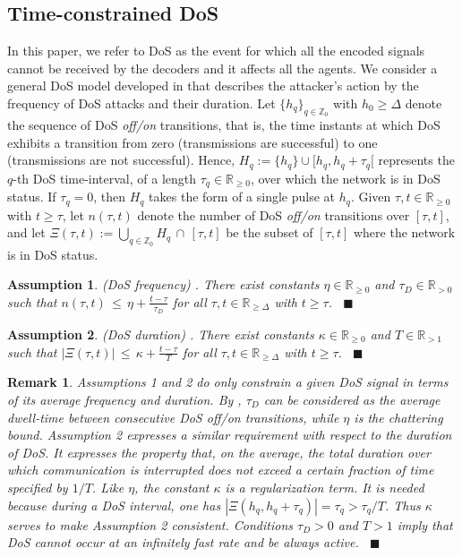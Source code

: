 \documentclass[letterpaper,journal,final,twocolumn]{IEEEtran}
\def\qedp{\hspace*{\fill}~{\tiny $\blacksquare$}}
\newtheorem{itremark}{Remark}
\newtheorem{itassumption}{Assumption}
\newenvironment{remark}{\begin{itremark}\rm}{\end{itremark}}
\newenvironment{assumption}{\begin{itassumption}\rm}{\end{itassumption}}
\begin{document}
\vspace{-2mm}

\subsection{Time-constrained DoS}
\vspace{-1mm}
In this paper, we refer to DoS as the event for which all the encoded signals cannot be received by the decoders and it affects all the agents.  
We consider a general DoS model developed in \cite{de2015input}
that describes the attacker's action by the frequency of DoS attacks and their duration. Let 
$\{h_q\}_{q \in \mathbb Z_0}$ with $h_0 \geq \Delta$ denote the sequence 
of DoS \emph{off/on} transitions, that is,
the time instants at which DoS exhibits 
a transition from zero (transmissions are successful) to one 
(transmissions are not successful).
Hence,
$
H_q :=\{h_q\} \cup [h_q,h_q+\tau_q[  
$
represents the $q$-th DoS time-interval, of a length $\tau_q \in \mathbb R_{\geq 0}$,
over which the network is in DoS status. If $\tau_q=0$, then
$H_q$ takes the form of a single pulse at $h_q$.  
Given $\tau,t \in \mathbb R_{\geq0}$ with $t\geq\tau$, 
let $n(\tau,t)$
denote the number of DoS \emph{off/on} transitions
over $[\tau,t]$, and let 
$
\Xi(\tau,t) := \bigcup_{q \in \mathbb Z_0} H_q  \, \cap  \, [\tau,t] 
$
be the subset of $[\tau,t]$ where the network is in DoS status. 

\begin{assumption}
(\emph{DoS frequency}) \cite{de2015input}. 
	There exist constants 
	$\eta \in \mathbb R_{\geq 0}$ and 
	$\tau_D \in \mathbb R_{> 0}$ such that
$
	n(\tau,t)  \, \leq \,  \eta + \frac{t-\tau}{\tau_D}
$
	for all  $\tau,t \in \mathbb R_{\geq \Delta}$ with $t\geq\tau$.
	\qedp
\end{assumption}

\begin{assumption} 
	(\emph{DoS duration}) \cite{de2015input}. 
	There exist constants $\kappa \in \mathbb R_{\geq 0}$ and $T  \in \mathbb R_{>1}$ such that
$
	|\Xi(\tau,t)|  \, \leq \,  \kappa + \frac{t-\tau}{T}
$
	for all  $\tau,t \in \mathbb R_{\geq \Delta}$ with $t\geq\tau$. 
	\qedp
\end{assumption}

\begin{remark}
	Assumptions 1 and 2
	do only constrain a given DoS signal in terms of its average frequency and duration.
	By \cite{hespanha1999stability}, $\tau_D$ can be considered as the average dwell-time between 
	consecutive DoS off/on transitions, while $\eta$ is the chattering bound.
	Assumption 2 expresses a similar 
	requirement with respect to the duration of DoS. 
	It expresses the property that, on the average,
	the total duration over which communication is 
	interrupted does not exceed a certain \emph{fraction} of time specified by $1/T$.
	Like $\eta$, the constant $\kappa$ is a regularization term. It is needed because
	during a DoS interval, one has $|\Xi(h_q,h_q+\tau_q)| = \tau_q >  \tau_q /T$.
	Thus $\kappa$ serves to make Assumption 2 consistent. 
	Conditions $\tau_D>0$ and $T>1$ imply that DoS cannot occur at an infinitely
	fast rate and be always active. \qedp
\end{remark}
\end{document}
